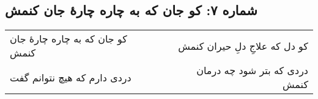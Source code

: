 \begin{center}
\section*{شماره ۷: کو جان که به چاره چارۀ جان کنمش}
\label{sec:007}
\begin{longtable}{l p{0.5cm} r}
کو جان که به چاره چارهٔ جان کنمش
&&
کو دل که علاجِ دلِ حیران کنمش
\\
دردی دارم که هیچ نتوانم گفت
&&
دردی که بتر شود چه درمان کنمش
\\
\end{longtable}
\end{center}
